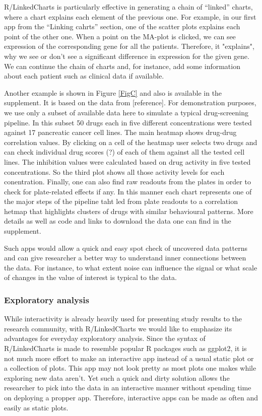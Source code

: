 \documentclass[twocolumn,10pt]{article}
\begin{document}
R/LinkedCharts is particularly effective in generating a chain of ``linked'' charts, where a chart explains each element of the previous one. For example, in our first app from the ``Linking cahrts'' section, one of the scatter plots explains each point of the other one. When a point on the MA-plot is clicked, we can see expression of the corresponding gene for all the patients. Therefore, it "explains", why we see or don't see a significant difference in expression for the given gene. We can continue the chain of charts and, for instance, add some information about each patient such as clinical data if available. 

Another example is shown in Figure \ref{FigC} and also is available in the supplement. It is based on the data from [reference].
For demonstration purposes, we use only a subset of available data here to simulate a typical drug-screening pipeline. In this subset 50 drugs each in five different concentrations were tested against 17 pancreatic cancer cell lines. The main heatmap shows drug-drug correlation values. By clicking on a cell of the heatmap user selects two drugs and can check individual drug scores (?) of each of them against all the tested cell lines. The inhibition values were calculated based on drug activity in five tested concentrations. So the third plot shows all those activity levels for each conentration. Finally, one can also find raw readouts from the plates in order to check for plate-related effects if any. In this manner each chart represents one of the major steps of the pipeline taht led from plate readouts to a correlation hetmap that highlights clusters of drugs with similar behavioural patterns. More details as well as code and links to download the data one can find in the supplement. 

Such apps would allow a quick and easy spot check of uncovered data patterns and can give researcher a better way to understand inner connections between the data. For instance, to what extent noise can influence the signal or what scale of changes in the value of interest is typical to the data.

\subsubsection{Exploratory analysis}

While interactivity is already heavily used for presenting study results to the research community, with R/LinkedCharts we would like to emphasize its advantages for everyday exploratory analysis. Since the syntax of R/LinkedCharts is made to resemble popular R packages such as ggplot2, it is not much more effort to make an interactive app instead of a usual static plot or a collection of plots. This app may not look pretty as most plots one makes while exploring new data aren't. Yet such a quick and dirty solution allows the researcher to pick into the data in an interactive manner without spending time on deploying a propper app. Therefore, interactive apps can be made as often and easily as static plots.
\end{document}

